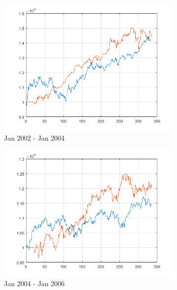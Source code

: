 \documentclass[11pt,a4,twosided,singlespacing,titlepagenumber=on]{scrreprt}
\numberwithin{equation}{chapter} %
\theoremstyle{remark}
\begin{document}
\begin{figure}[H]
\begin{subfigure}[t]{0.32\textwidth}
        \includegraphics[width=1\textwidth]{res/backtest/7}
        \caption{Jan 2002 - Jan 2004}
    \end{subfigure}
    \begin{subfigure}[t]{0.32\textwidth}
        \centering
        \includegraphics[width=1\textwidth]{res/backtest/8}
        \caption{Jan 2004 - Jan 2006}
    \end{subfigure}
    \begin{subfigure}[t]{0.32\textwidth}
        \centering

\end{subfigure}
\end{figure}
\end{document}
